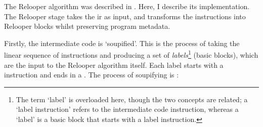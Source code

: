 \documentclass[00-main.tex]{subfiles}
\begin{document}
The Relooper algorithm was described in .
Here, I describe its implementation.
The Relooper stage takes the \gls{ir} as input, and transforms the instructions into Relooper blocks whilst preserving program metadata.

Firstly, the intermediate code is `soupified'.
This is the process of taking the linear sequence of instructions and producing a set of \emph{labels}\footnote{The term `label' is overloaded here, though the two concepts are related; a `label instruction' refers to the intermediate code instruction, whereas a `label' is a basic block that starts with a label instruction.} (basic blocks), which are the input to the Relooper algorithm itself.
Each label starts with a  instruction and ends in a .
The process of soupifying is :
\end{document}
